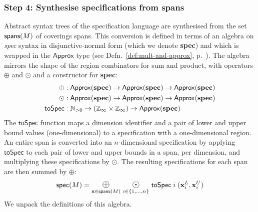 \documentclass[10pt,preprint]{sigplanconf}
\theoremstyle{definition}
\newcommand{\term}[1]{\texttt{#1}}
\newcommand{\vect}[1]{\textbf{#1}}
\begin{document}
\subsubsection{Step 4: Synthesise specifications from spans}
\label{sec:inf-step4}

\newcommand{\oplusbig}{\operatornamewithlimits{\term{\Large{$\oplus$}}}}
\newcommand{\odobig}{\operatornamewithlimits{\term{\Large{$\odot$}}}}
\newcommand{\bplus}{\operatornamewithlimits{\term{\Large{+}}}}
\newcommand{\tySum}[1]{#1^{\term{+}}}
\newcommand{\tyProd}[1]{#1^{\term{*}}}
\newcommand{\specDNF}{\textbf{spec}}

Abstract syntax trees of the specification language
are synthesised from the set $\textsf{spans}(M)$ of coverings spans.
This conversion is defined in terms
of an algebra on \textit{spec} syntax in disjunctive-normal form
(which we denote \specDNF{}) and which is wrapped
in the $\textsf{Approx}$ type (see
Defn.~\ref{def:mult-and-approx},
p.~\pageref{def:mult-and-approx}).  The algebra mirrors the shape
of the region combinators for sum and product,
with operators $\oplus$ and $\odot$ and a constructor for \specDNF{}:
\begin{align*}
\oplus & : \mathsf{Approx}(\specDNF) \rightarrow \mathsf{Approx}(\specDNF) \rightarrow
  \mathsf{Approx}(\specDNF) \\
\odot & : \mathsf{Approx}(\specDNF) \rightarrow \mathsf{Approx}(\specDNF) \rightarrow
        \mathsf{Approx}(\specDNF) \\
\mathsf{toSpec} & : \mathbb{N}_{>0} \rightarrow (\domainVal{} \times \domainVal{}) \rightarrow \mathsf{Approx}(\specDNF)
\end{align*}
The $\mathsf{toSpec}$ function maps a dimension identifier
and a pair of lower and upper bound
values (one-dimensional) to a specification with a one-dimensional region.
An entire span is converted into an $n$-dimensional
specification by applying $\mathsf{toSpec}$ to each
pair of lower and upper bounds in a span, per dimension, and multiplying these
specifications by $\odot$. The resulting specifications for
each span are then summed by $\oplus$:
\begin{equation*}
\textsf{spec}(M) =
\oplusbig\limits_{\vect{x} \in \spanOp(M)} \,
\odobig\limits_{i \in \{1, \ldots, n\}} \, \mathsf{toSpec} \; i \; (\vect{x}^L_i, \vect{x}^U_i)
\end{equation*}
We unpack the definitions of this algebra.
\end{document}
